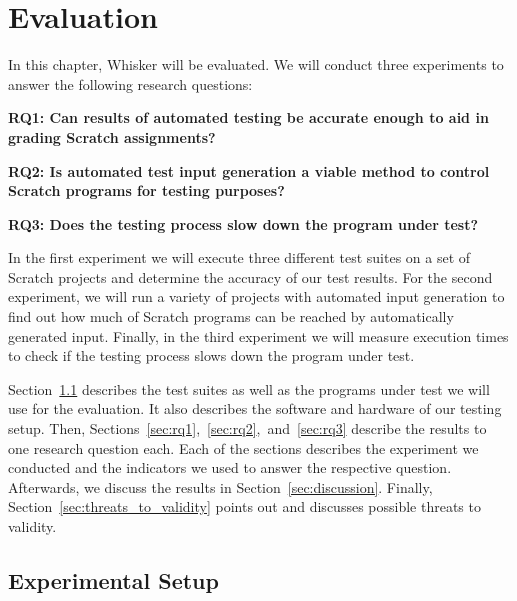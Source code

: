 

\chapter{Evaluation}%
\label{cha:evaluation}

In this chapter, Whisker will be evaluated.
We will conduct three experiments to answer the following research questions:

{
    \parspace

    \centering
    \begin{minipage}{.9\textwidth}
        \textbf{RQ1: Can results of automated testing be accurate enough to aid in grading Scratch assignments?}
        \parspace

        \noindent \textbf{RQ2: Is automated test input generation a viable method to control Scratch programs for testing purposes?}
        \parspace

        \noindent \textbf{RQ3: Does the testing process slow down the program under test?}
    \end{minipage}

    \parspace
}


\noindent In the first experiment we will execute three different test suites on a set of Scratch projects
and determine the accuracy of our test results.
For the second experiment, we will run a variety of projects with automated input generation
to find out how much of Scratch programs can be reached by automatically generated input.
Finally, in the third experiment we will measure execution times
to check if the testing process slows down the program under test.
\parspace

Section~\ref{sec:experimental_setup} describes the test suites as well as the programs under test we will use for the evaluation.
It also describes the software and hardware of our testing setup.
Then, Sections~\ref{sec:rq1},~\ref{sec:rq2},~and~\ref{sec:rq3} describe the results to one research question each.
Each of the sections describes the experiment we conducted and the indicators we used
to answer the respective question.
Afterwards, we discuss the results in Section~\ref{sec:discussion}.
Finally, Section~\ref{sec:threats_to_validity} points out and discusses possible threats to validity.

\section{Experimental Setup}
\label{sec:experimental_setup}

